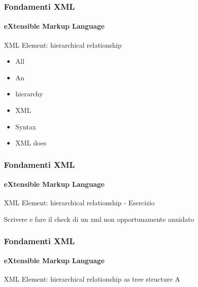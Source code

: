 \begin{frame}
    \frametitle{Fondamenti XML}
    \framesubtitle{eXtensible Markup Language}
    \addtocounter{nframe}{1}

	\begin{block}{XML Element: hierarchical relationship}
		\begin{itemize}
			\item All %
			\item An %
			\item hierarchy %
			\item XML %
			\item Syntax %
			\item XML does %
		\end{itemize}
	\end{block}

\end{frame}


\begin{frame}
    \frametitle{Fondamenti XML}
    \framesubtitle{eXtensible Markup Language}
    \addtocounter{nframe}{1}

	\begin{block}{XML Element: hierarchical relationship - Esercizio}
		\begin{center}
			Scrivere e fare il check di un xml non opportunamente annidato
		\end{center}
	\end{block}

\end{frame}




\begin{frame}
    \frametitle{Fondamenti XML}
    \framesubtitle{eXtensible Markup Language}
    \addtocounter{nframe}{1}

	\begin{block}{XML Element: hierarchical relationship as tree structure}
		A%
	\end{block}

\end{frame}



